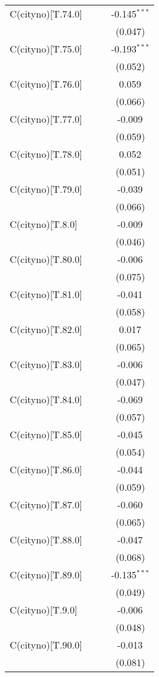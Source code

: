 \begin{table}[!htbp]
\begin{tabular}{@{\extracolsep{5pt}}lccc}
 C(cityno)[T.74.0] & & & -0.145$^{***}$ \\
& & & (0.047) \\
 C(cityno)[T.75.0] & & & -0.193$^{***}$ \\
& & & (0.052) \\
 C(cityno)[T.76.0] & & & 0.059$^{}$ \\
& & & (0.066) \\
 C(cityno)[T.77.0] & & & -0.009$^{}$ \\
& & & (0.059) \\
 C(cityno)[T.78.0] & & & 0.052$^{}$ \\
& & & (0.051) \\
 C(cityno)[T.79.0] & & & -0.039$^{}$ \\
& & & (0.066) \\
 C(cityno)[T.8.0] & & & -0.009$^{}$ \\
& & & (0.046) \\
 C(cityno)[T.80.0] & & & -0.006$^{}$ \\
& & & (0.075) \\
 C(cityno)[T.81.0] & & & -0.041$^{}$ \\
& & & (0.058) \\
 C(cityno)[T.82.0] & & & 0.017$^{}$ \\
& & & (0.065) \\
 C(cityno)[T.83.0] & & & -0.006$^{}$ \\
& & & (0.047) \\
 C(cityno)[T.84.0] & & & -0.069$^{}$ \\
& & & (0.057) \\
 C(cityno)[T.85.0] & & & -0.045$^{}$ \\
& & & (0.054) \\
 C(cityno)[T.86.0] & & & -0.044$^{}$ \\
& & & (0.059) \\
 C(cityno)[T.87.0] & & & -0.060$^{}$ \\
& & & (0.065) \\
 C(cityno)[T.88.0] & & & -0.047$^{}$ \\
& & & (0.068) \\
 C(cityno)[T.89.0] & & & -0.135$^{***}$ \\
& & & (0.049) \\
 C(cityno)[T.9.0] & & & -0.006$^{}$ \\
& & & (0.048) \\
 C(cityno)[T.90.0] & & & -0.013$^{}$ \\
& & & (0.081) \\

\end{tabular}
\end{table}

